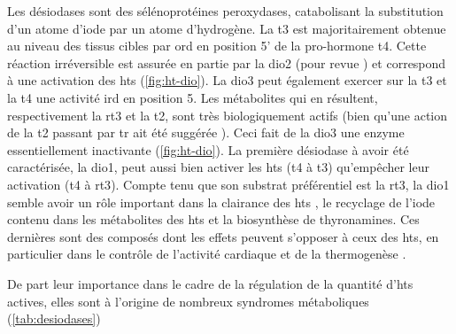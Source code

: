 \documentclass[../main.tex]{subfiles}
\begin{document}
Les désiodases sont des sélénoprotéines peroxydases, catabolisant la substitution d'un atome d'iode par un atome d'hydrogène.
La \gls{t3} est majoritairement obtenue au niveau des tissus cibles par \gls{ord} en position 5' de la pro-hormone \gls{t4}.
Cette réaction irréversible est assurée en partie par la \gls{dio2} (pour revue \citealp{Williams2011}) et correspond à une activation des \glspl{ht} (\autoref{fig:ht-dio}).
La \gls{dio3} peut également exercer sur la \gls{t3} et la \gls{t4} une activité \gls{ird} en position 5.
Les métabolites qui en résultent, respectivement la \gls{rt3} et la \gls{t2}, sont très biologiquement actifs (bien qu'une action de la \gls{t2} passant par \gls{tr} ait été suggérée \citealp{Mendoza2013}).
Ceci fait de la \gls{dio3} une enzyme essentiellement inactivante (\autoref{fig:ht-dio}).
La première désiodase à avoir été caractérisée, la \gls{dio1}, peut aussi bien activer les \glspl{ht} (\gls{t4} à \gls{t3}) qu'empêcher leur activation (\gls{t4} à \gls{rt3}).
Compte tenu que son substrat préférentiel est la \gls{rt3}, la \gls{dio1} semble avoir un rôle important dans la clairance des \glspl{ht} \citep{Maia2011}, le recyclage de l'iode contenu dans les métabolites des \glspl{ht} \citep{Schneider2006} et la biosynthèse de thyronamines.
Ces dernières sont des composés dont les effets peuvent s'opposer à ceux des \glspl{ht}, en particulier dans le contrôle de l'activité cardiaque et de la thermogenèse \citep{Scanlan2004}.
\par
De part leur importance dans le cadre de la régulation de la quantité d'\glspl{ht} actives, elles sont à l'origine de nombreux syndromes métaboliques (\autoref{tab:desiodases})


\end{document}
